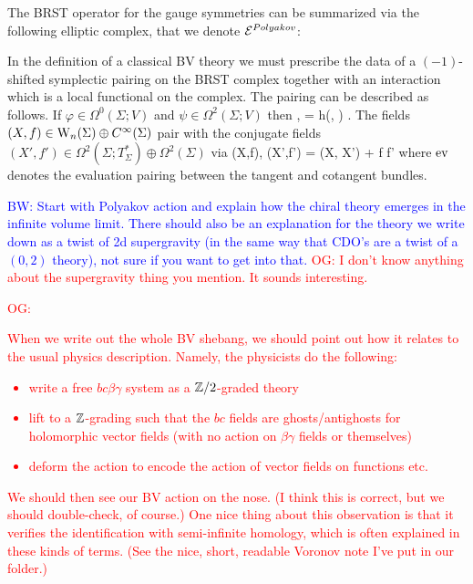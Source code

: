 \documentclass[10pt]{amsart}
\def\brian{\textcolor{blue}{BW: }\textcolor{blue}}
\def\owen{\textcolor{red}{OG: }\textcolor{red}}
\begin{document}
The BRST operator for the gauge symmetries can be summarized via the following elliptic complex, that we denote $\mathcal E^{Polyakov}$:

\ben
{}
\een 
In the definition of a classical BV theory we must prescribe the data of a $(-1)$-shifted symplectic pairing on the BRST complex together with an interaction which is a local functional on the complex. The pairing can be described as follows. If $\varphi \in \Omega^0(\Sigma ; V)$ and $\psi \in \Omega^2(\Sigma ; V)$ then
\ben
\<\varphi, \psi \> = \int h(\varphi, \psi) .
\een 
The fields $(X, f) \in {{\rm W}_n}(\Sigma) \oplus C^\infty(\Sigma)$ pair with the conjugate fields $(X', f') \in  \Omega^2(\Sigma ; T^*_\Sigma) \oplus \Omega^2(\Sigma)$ via
\ben
\<(X,f), (X',f')\> = \int \ev(X, X') + \int f f' 
\een
where ${\rm ev}$ denotes the evaluation pairing between the tangent and cotangent bundles. 

\brian{Start with Polyakov action and explain how the chiral theory emerges in the infinite volume limit. There should also be an explanation for the theory we write down as a twist of 2d supergravity (in the same way that CDO's are a twist of a $(0,2)$ theory), not sure if you want to get into that.}
\owen{I don't know anything about the supergravity thing you mention. It sounds interesting.}

\owen{When we write out the whole BV shebang, we should point out how it relates to the usual physics description. Namely, the physicists do the following:
\begin{itemize}
\item write a free $bc\beta\gamma$ system as a $\mathbb Z/2$-graded theory
\item lift to a $\mathbb Z$-grading such that the $bc$ fields are ghosts/antighosts for holomorphic vector fields (with no action on $\beta\gamma$ fields or themselves)
\item deform the action to encode the action of vector fields on functions etc.
\end{itemize}
We should then see our BV action on the nose.
(I think this is correct, but we should double-check, of course.)
One nice thing about this observation is that it verifies the identification with semi-infinite homology, which is often explained in these kinds of terms. 
(See the nice, short, readable Voronov note I've put in our folder.)}
\end{document}
